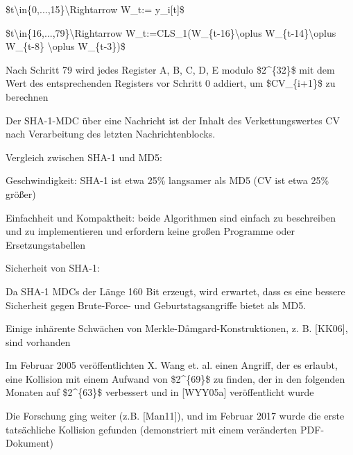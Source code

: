 \documentclass[a4paper]{article}
\begin{document}
\begin{multicols}{3}
\begin{itemize*}
            \begin{itemize*}
                  \item \$t\textbackslash in\{0,...,15\}\textbackslash Rightarrow W\_t:= y\_i{[}t{]}\$
                  \item \$t\textbackslash in\{16,...,79\}\textbackslash Rightarrow W\_t:=CLS\_1(W\_\{t-16\}\textbackslash oplus W\_\{t-14\}\textbackslash oplus W\_\{t-8\} \textbackslash oplus W\_\{t-3\})\$
                  \item Nach Schritt 79 wird jedes Register A, B, C, D, E modulo \$2\^{}\{32\}\$ mit dem Wert des entsprechenden Registers vor Schritt 0 addiert, um \$CV\_\{i+1\}\$ zu berechnen
            \end{itemize*}
            \item Der SHA-1-MDC über eine Nachricht ist der Inhalt des Verkettungswertes
            CV nach Verarbeitung des letzten Nachrichtenblocks.
            \item Vergleich zwischen SHA-1 und MD5:
            \begin{itemize*}
                  \item Geschwindigkeit: SHA-1 ist etwa 25\% langsamer als MD5 (CV ist etwa 25\% größer)
                  \item Einfachheit und Kompaktheit: beide Algorithmen sind einfach zu beschreiben und zu implementieren und erfordern keine großen Programme oder Ersetzungstabellen
            \end{itemize*}
            \item Sicherheit von SHA-1:
            \begin{itemize*}
                  \item Da SHA-1 MDCs der Länge 160 Bit erzeugt, wird erwartet, dass es eine bessere Sicherheit gegen Brute-Force- und Geburtstagsangriffe bietet als MD5.
                  \item Einige inhärente Schwächen von Merkle-Dåmgard-Konstruktionen, z. B. {[}KK06{]}, sind vorhanden
                  \item Im Februar 2005 veröffentlichten X. Wang et. al. einen Angriff, der es erlaubt, eine Kollision mit einem Aufwand von \$2\^{}\{69\}\$ zu finden, der in den folgenden Monaten auf \$2\^{}\{63\}\$ verbessert und in {[}WYY05a{]} veröffentlicht wurde
                  \item Die Forschung ging weiter (z.B. {[}Man11{]}), und im Februar 2017 wurde die erste tatsächliche Kollision gefunden (demonstriert mit einem veränderten PDF-Dokument)

\end{itemize*}
\end{itemize*}
\end{multicols}
\end{document}
